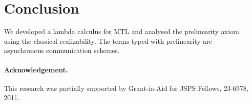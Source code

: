 \documentclass[envcountsame]{llncs}
\begin{document}



\section{Conclusion}
\label{sec:conclude}
We developed a lambda calculus for MTL and
analysed the prelinearity axiom using
the classical realizability.  The terms typed with prelinearity are
asynchronous communication schemes.

\paragraph{Acknowledgement.}
This research was partially supported by
Grant-in-Aid for JSPS Fellows, 23-6978, 2011.




\end{document}
